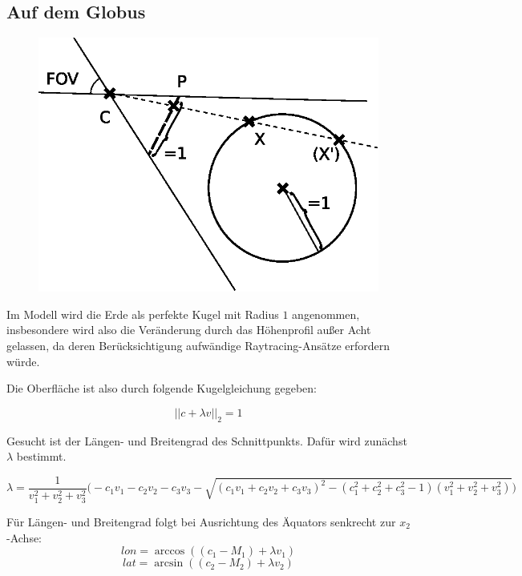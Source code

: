 \documentclass[10pt]{scrreprt}
\begin{document}
\subsection{Auf dem Globus}

\begin{figure}
\includegraphics[scale=0.75]{algo/SchnittKugel.eps}
\end{figure}

Im Modell wird die Erde als perfekte Kugel mit Radius $1$ angenommen, insbesondere wird also die Veränderung durch das Höhenprofil außer Acht gelassen, da deren Berücksichtigung aufwändige Raytracing-Ansätze erfordern würde.

Die Oberfläche ist also durch folgende Kugelgleichung gegeben:

\[||c+\lambda v||_2 = 1\]

Gesucht ist der Längen- und Breitengrad des Schnittpunkts. Dafür wird zunächst $\lambda$ bestimmt.


\newpage
\vspace{7mm}
\begin{equation*}
\lambda = \frac{1}{v_1^2+v_2^2+v_3^2}\Big(-c_1v_1-c_2v_2-c_3v_3
-\sqrt{\left(c_1v_1+c_2v_2+c_3v_3\right)^2-(c_1^2+c_2^2+c_3^2-1)(v_1^2+v_2^2+v_3^2)}\Big)
\end{equation*}

Für Längen- und Breitengrad folgt bei Ausrichtung des Äquators senkrecht zur $x_2$-Achse:
\[lon = \arccos((c_1-M_1)+\lambda v_1)\]
\[lat = \arcsin((c_2-M_2)+\lambda v_2)\]
\end{document}
